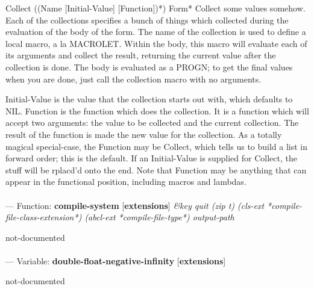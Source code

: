 \begin{adjustwidth}{5em}{5em}
Collect ({(Name [Initial-Value] [Function])}*) {Form}*
  Collect some values somehow.  Each of the collections specifies a bunch of
  things which collected during the evaluation of the body of the form.  The
  name of the collection is used to define a local macro, a la MACROLET.
  Within the body, this macro will evaluate each of its arguments and collect
  the result, returning the current value after the collection is done.  The
  body is evaluated as a PROGN; to get the final values when you are done, just
  call the collection macro with no arguments.

  Initial-Value is the value that the collection starts out with, which
  defaults to NIL.  Function is the function which does the collection.  It is
  a function which will accept two arguments: the value to be collected and the
  current collection.  The result of the function is made the new value for the
  collection.  As a totally magical special-case, the Function may be Collect,
  which tells us to build a list in forward order; this is the default.  If an
  Initial-Value is supplied for Collect, the stuff will be rplacd'd onto the
  end.  Note that Function may be anything that can appear in the functional
  position, including macros and lambdas.
\end{adjustwidth}

\paragraph{}
\label{EXTENSIONS:COMPILE-SYSTEM}
--- Function: \textbf{compile-system} [\textbf{extensions}] \textit{\&key quit (zip t) (cls-ext *compile-file-class-extension*) (abcl-ext *compile-file-type*) output-path}

\begin{adjustwidth}{5em}{5em}
not-documented
\end{adjustwidth}

\paragraph{}
\label{EXTENSIONS:DOUBLE-FLOAT-NEGATIVE-INFINITY}
--- Variable: \textbf{double-float-negative-infinity} [\textbf{extensions}] \textit{}

\begin{adjustwidth}{5em}{5em}
not-documented
\end{adjustwidth}

